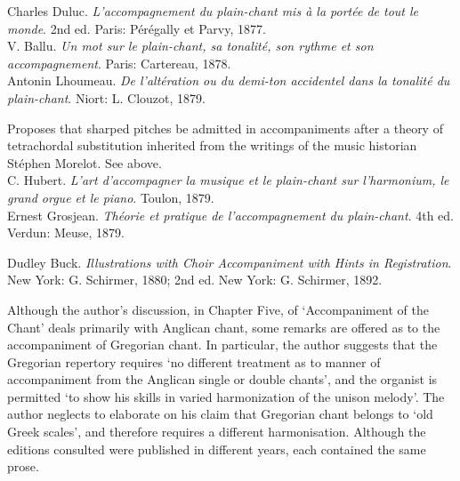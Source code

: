     \parindent=0pt
    \hangindent=0pt
  \covid{}Charles Duluc. \emph{L'accompagnement du plain-chant mis à la portée de tout le monde}. 2nd ed. Paris:  Pérégally et Parvy, 1877. \\

    \parindent=0pt
    \hangindent=0pt
  \covid{}V. Ballu. \emph{Un mot sur le plain-chant, sa tonalité, son rythme et son accompagnement}. Paris:  Cartereau, 1878. \\

    \parindent=0pt
    \hangindent=0pt
  Antonin Lhoumeau. \emph{De l'altération ou du demi-ton accidentel dans la tonalité du plain-chant}. Niort:  L. Clouzot, 1879.

     \parindent=20pt
     \hangindent=20pt
     Proposes that sharped pitches be admitted in accompaniments after a theory of tetrachordal substitution inherited from the writings of the music historian Stéphen Morelot. See  above.\\

    \parindent=0pt
    \hangindent=0pt
  \covid{}C. Hubert. \emph{L'art d'accompagner la musique et le plain-chant sur l'harmonium, le grand orgue et le piano}. Toulon, 1879. \\

    \parindent=0pt
    \hangindent=0pt
  \covid{}Ernest Grosjean. \emph{Théorie et pratique de l'accompagnement du plain-chant}. 4th ed. Verdun:  Meuse, 1879. \\\pagebreak{}

    \parindent=0pt
    \hangindent=0pt
  Dudley Buck. \emph{Illustrations with Choir Accompaniment with Hints in Registration}. New York:  G. Schirmer, 1880;  2nd ed. New York:  G. Schirmer, 1892.

     \parindent=20pt
     \hangindent=20pt
     Although the author's discussion, in Chapter Five, of `Accompaniment of the Chant' deals primarily with Anglican chant, some remarks are offered as to the accompaniment of Gregorian chant. In particular, the author suggests that the Gregorian repertory requires `no different treatment as to manner of accompaniment from the Anglican single or double chants', and the organist is permitted `to show his skills in varied harmonization of the unison melody'. The author neglects to elaborate on his claim that Gregorian chant belongs to `old Greek scales', and therefore requires a different harmonisation. Although the editions consulted were published in different years, each contained the same prose.\\

